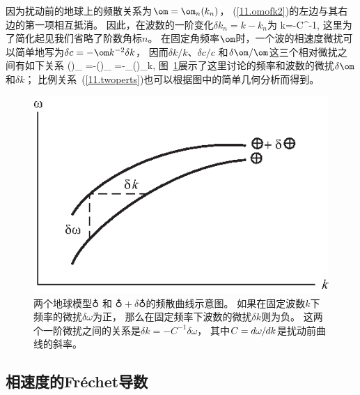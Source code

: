 因为扰动前的地球上的频散关系为$\om=\om_n(k_n)$，
(\ref{11.omofk2})的左边与其右边的第一项相互抵消。
因此，在波数的一阶变化$\delta k_n=k-k_n$为
%
\eq \label{11.twoperts}
\delta k=-C^{-1}\delta\om,
\en
这里为了简化起见我们省略了阶数角标$n$。
在固定角频率$\om$时，一个波的相速度微扰可以简单地写为$\delta c=-\om k^{-2}\delta k$，
%
因而$\delta k/k$、$\delta c/c$ 和$\delta\om/\om$这三个相对微扰之间有如下关系
\eq \label{11.threeperts}
\left(\right)_{\omega}
=-\left(\right)_{\omega}
=-_{}\left(\frac{\delta\om}{\om}\right)_k,
\en
图~\ref{11.fig.dkdom}展示了这里讨论的频率和波数的微扰$\delta\om$和$\delta k$；
比例关系~(\ref{11.twoperts})也可以根据图中的简单几何分析而得到。
\begin{figure}
\begin{center}
\includegraphics{../figures/chap11/fig22.eps}
\end{center}
\caption[dkdom relation]{\label{11.fig.dkdom}
两个地球模型$\earth$ 和 $\earth+\delta\earth$的频散曲线示意图。
如果在固定波数$k$下频率的微扰$\delta\omega$为正，
那么在固定频率下波数的微扰$\delta k$则为负。
这两个一阶微扰之间的关系是$\delta k=-C^{-1}\delta\omega$，
其中$C=d\omega\hspace{-0.2 mm}/\hspace{-0.2 mm}dk$是扰动前曲线的斜率。
}
\end{figure}

\subsection{相速度的Fr\'{e}chet导数}
%
%

